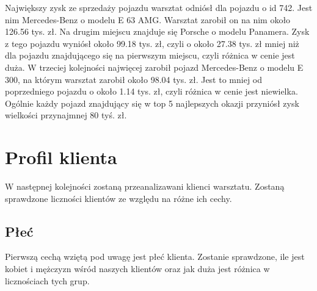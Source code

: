 \documentclass{article}\usepackage[]{graphicx}\usepackage[]{xcolor}
\begin{document}
Największy zysk ze sprzedaży pojazdu warsztat odniósł dla pojazdu o id 742. Jest nim Mercedes-Benz o modelu E 63 AMG. Warsztat zarobił on na nim około 126.56 tys. zł. 
Na drugim miejscu znajduje się Porsche o modelu Panamera. Zysk z tego pojazdu wyniósł około 99.18 tys. zł, czyli o około 27.38 tys. zł mniej niż dla pojazdu znajdującego się na pierwszym miejscu, czyli różnica w cenie jest duża.
W trzeciej kolejności najwięcej zarobił pojazd Mercedes-Benz o modelu E 300, na którym warsztat zarobił około 98.04 tys. zł. Jest to mniej od poprzedniego pojazdu o około 1.14 tys. zł, czyli różnica w cenie jest niewielka. 
Ogólnie każdy pojazd znajdujący się w top 5 najlepszych okazji przyniósł zysk wielkości przynajmnej 80 tyś. zł.

\section{Profil klienta}

W następnej kolejności zostaną przeanalizawani klienci warsztatu. Zostaną sprawdzone liczności klientów ze względu na różne ich cechy.

\subsection{Płeć}

Pierwszą cechą wziętą pod uwagę jest płeć klienta. Zostanie sprawdzone, ile jest kobiet i mężczyzn wśród naszych klientów oraz jak duża jest różnica w licznościach tych grup.
\end{document}
